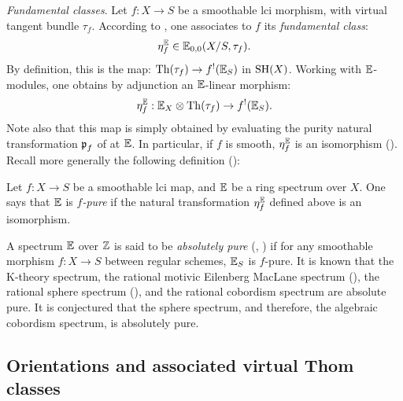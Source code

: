 \begin{num}\textit{Fundamental classes}.\label{num:fdl_class}
Let $f:X \rightarrow S$ be a smoothable lci morphism, with virtual tangent bundle $\tau_f$.
According to \cite[Th. 3.3.2, Def. 4.1.3]{DJK}, one associates to $f$ its \emph{fundamental
class}:
$$
\eta_f^\mathbb E \in \mathbb E_{0,0}(X/S,\tau_f).
$$
By definition, this is the map: $\operatorname{Th}(\tau_f) \rightarrow f^!(\mathbb E_S)$ in $\operatorname{SH}(X)$.
Working with $\mathbb E$-modules, one obtains by adjunction an $\mathbb E$-linear morphism:
\begin{equation}\label{eq:fdl_biv}
\eta_f^\mathbb E:\mathbb E_X \otimes \operatorname{Th}(\tau_f) \rightarrow f^!(\mathbb E_S).
\end{equation}
Note also that this map is simply obtained by evaluating the purity
natural transformation $\operatorname{\mathfrak p}_f$ of \cite[4.3.1]{DJK} at $\mathbb E$.
In particular, if $f$ is smooth, $\eta_f^\mathbb E$ is an isomorphism (\cite[Rem. 4.3.8]{DJK}).
Recall more generally the following definition (\cite[Def. 4.3.7]{DJK}):
\end{num}
\begin{df}\label{df:f-pure}
Let $f:X \rightarrow S$ be a smoothable lci map,
 and $\mathbb E$ be a ring spectrum over $X$.
 One says that $\mathbb E$ is \emph{$f$-pure} if the natural transformation $\eta_f^\mathbb E$ defined above is an isomorphism.
\end{df}

\begin{rem}
A spectrum $\mathbb E$ over $\mathbb{Z}$ is said to be \emph{absolutely pure} (\cite[4.3.11]{DJK}, \cite[1.3.2]{Deg12})
 if for any smoothable morphism $f:X \rightarrow S$ between regular schemes, $\mathbb E_S$ is $f$-pure.
 It is known that the K-theory spectrum, the rational motivic Eilenberg MacLane spectrum (\cite[14.4.1]{CD3}),
 the rational sphere spectrum (\cite{DFJK}), and the rational cobordism spectrum are absolute pure.
 It is conjectured that the sphere spectrum, and therefore, the algebraic cobordism spectrum, is absolutely pure.
\end{rem}

\subsection{Orientations and associated virtual Thom classes}

%

